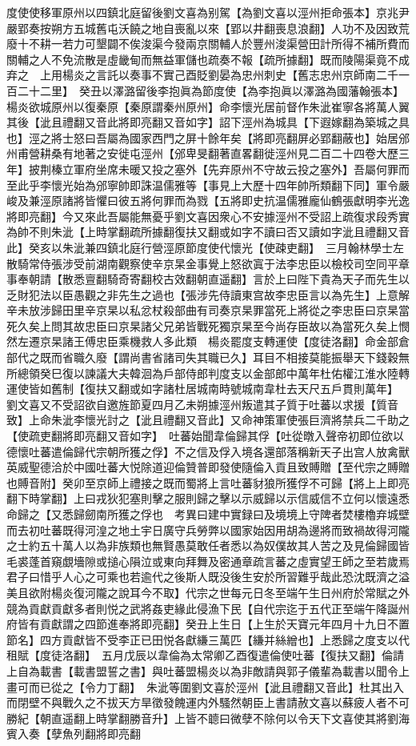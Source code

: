 度使使移軍原州以四鎮北庭留後劉文喜為别駕【為劉文喜以涇州拒命張本】京兆尹嚴郢奏按朔方五城舊屯沃饒之地自喪亂以來【郢以井翻喪息浪翻】人功不及因致荒廢十不耕一若力可墾闢不俟浚渠今發兩京關輔人於豐州浚渠營田計所得不補所費而關輔之人不免流散是虛畿甸而無益軍儲也疏奏不報【疏所據翻】既而陵陽渠竟不成弃之　上用楊炎之言託以奏事不實己酉貶劉晏為忠州刺史【舊志忠州京師南二千一百二十二里】　癸丑以澤潞留後李抱眞為節度使【為李抱眞以澤潞為國藩翰張本】　楊炎欲城原州以復秦原【秦原謂秦州原州】命李懷光居前督作朱泚崔寧各將萬人翼其後【泚且禮翻又音此將即亮翻又音如字】詔下涇州為城具【下遐嫁翻為築城之具也】涇之將士怒曰吾屬為國家西門之屏十餘年矣【將即亮翻屏必郢翻蔽也】始居邠州甫營耕桑有地著之安徙屯涇州【邠卑旻翻著直畧翻徙涇州見二百二十四卷大歷三年】披荆榛立軍府坐席未暖又投之塞外【先弃原州不守故云投之塞外】吾屬何罪而至此乎李懷光始為邠寧帥即誅温儒雅等【事見上大歷十四年帥所類翻下同】軍令嚴峻及兼涇原諸將皆懼曰彼五將何罪而為戮【五將即史抗温儒雅龐仙鶴張獻明李光逸將即亮翻】今又來此吾屬能無憂乎劉文喜因衆心不安據涇州不受詔上疏復求段秀實為帥不則朱泚【上時掌翻疏所據翻復扶又翻或如字不讀曰否又讀如字泚且禮翻又音此】癸亥以朱泚兼四鎮北庭行營涇原節度使代懷光【使疎吏翻】　三月翰林學士左散騎常侍張涉受前湖南觀察使辛京杲金事覺上怒欲寘于法李忠臣以檢校司空同平章事奉朝請【散悉亶翻騎奇寄翻校古效翻朝直遥翻】言於上曰陛下貴為天子而先生以乏財犯法以臣愚觀之非先生之過也【張涉先侍讀東宫故李忠臣言以為先生】上意解辛未放涉歸田里辛京杲以私忿杖殺部曲有司奏京杲罪當死上將從之李忠臣曰京杲當死久矣上問其故忠臣曰京杲諸父兄弟皆戰死獨京杲至今尚存臣故以為當死久矣上憫然左遷京杲諸王傅忠臣乘機救人多此類　楊炎罷度支轉運使【度徒洛翻】命金部倉部代之既而省職久廢【謂尚書省諸司失其職已久】耳目不相接莫能振舉天下錢穀無所總領癸巳復以諫議大夫韓洄為戶部侍郎判度支以金部郎中萬年杜佑權江淮水陸轉運使皆如舊制【復扶又翻或如字諸杜居城南時號城南韋杜去天尺五戶貫則萬年】　劉文喜又不受詔欲自邀旌節夏四月乙未朔據涇州叛遣其子質于吐蕃以求援【質音致】上命朱泚李懷光討之【泚且禮翻又音此】又命神策軍使張巨濟將禁兵二千助之【使疏吏翻將即亮翻又音如字】　吐蕃始聞韋倫歸其俘【吐從暾入聲帝初即位欲以德懷吐蕃遣倫歸代宗朝所獲之俘】不之信及俘入境各還部落稱新天子出宫人放禽獸英威聖德洽於中國吐蕃大悦除道迎倫贊普即發使隨倫入貢且致賻贈【至代宗之賻贈也賻音附】癸卯至京師上禮接之既而蜀將上言吐蕃豺狼所獲俘不可歸【將上上即亮翻下時掌翻】上曰戎狄犯塞則擊之服則歸之擊以示威歸以示信威信不立何以懷遠悉命歸之【又悉歸劒南所獲之俘也　考異曰建中實録曰及境境上守陴者焚樓櫓弃城壁而去初吐蕃既得河湟之地土宇日廣守兵勞弊以國家始因用胡為邊將而致禍故得河隴之士約五十萬人以為非族類也無賢愚莫敢任者悉以為奴僕故其人苦之及見倫歸國皆毛裘蓬首窺覷墻隙或搥心隕泣或東向拜舞及密通章疏言蕃之虛實望王師之至若歲焉君子曰惜乎人心之可乘也若逾代之後斯人既没後生安於所習難乎哉此恐沈既濟之溢美且欲附楊炎復河隴之說耳今不取】代宗之世每元日冬至端午生日州府於常賦之外競為貢獻貢獻多者則悦之武將姦吏緣此侵漁下民【自代宗迄于五代正至端午降誕州府皆有貢獻謂之四節進奉將即亮翻】癸丑上生日【上生於天寶元年四月十九日不置節名】四方貢獻皆不受李正已田悦各獻縑三萬匹【縑并絲繒也】上悉歸之度支以代租賦【度徒洛翻】　五月戊辰以韋倫為太常卿乙酉復遣倫使吐蕃【復扶又翻】倫請上自為載書【載書盟誓之書】與吐蕃盟楊炎以為非敵請與郭子儀輩為載書以聞令上畫可而已從之【令力丁翻】　朱泚等圍劉文喜於涇州【泚且禮翻又音此】杜其出入而閉壁不與戰久之不拔天方旱徵發餽運内外騷然朝臣上書請赦文喜以蘇疲人者不可勝紀【朝直遥翻上時掌翻勝音升】上皆不聼曰微孽不除何以令天下文喜使其將劉海賓入奏【孽魚列翻將即亮翻